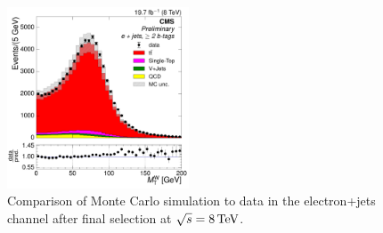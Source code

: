 \begin{figure}[hbtp]
     \includegraphics[width=0.48\textwidth]{Chapters/04_Analysis/04b_XSections/images/control_plots/before_fit/8TeV/EPlusJets_patType1CorrectedPFMet_MT_2orMoreBtags_with_ratio.pdf}\hfill
     \caption{Comparison of Monte Carlo simulation to data in the electron+jets channel after final
     selection at $\sqrt{s}=8\,\text{Te\hspace{-.08em}V}$.}
     \label{fig:data_mc_comparison_8TeV_electron}
\end{figure}
 
